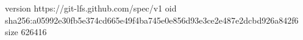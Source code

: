 version https://git-lfs.github.com/spec/v1
oid sha256:a05992e30fb5e374cd665e49f4ba745e0e856d93e3ce2e487e2dcbd926a842f6
size 626416

